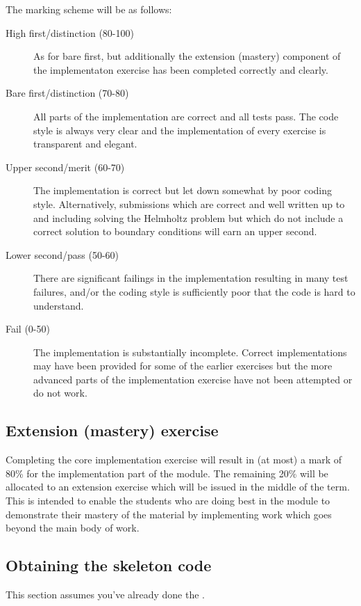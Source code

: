 \documentclass{book}
\begin{document}
The marking scheme will be as follows:
\begin{description}
\item[{High first/distinction (80-100)}] \leavevmode
As for bare first, but additionally the extension (mastery)
component of the implementaton exercise has been completed correctly
and clearly.

\item[{Bare first/distinction (70-80)}] \leavevmode
All parts of the implementation are correct and all tests pass. The
code style is always very clear and the implementation of every
exercise is transparent and elegant.

\item[{Upper second/merit (60-70)}] \leavevmode
The implementation is correct but let down somewhat by poor coding
style. Alternatively, submissions which are correct and well
written up to and including solving the Helmholtz problem but
which do not include a correct solution to boundary conditions will
earn an upper second.

\item[{Lower second/pass (50-60)}] \leavevmode
There are significant failings in the implementation resulting in
many test failures, and/or the coding style is
sufficiently poor that the code is hard to understand.

\item[{Fail (0-50)}] \leavevmode
The implementation is substantially incomplete. Correct
implementations may have been provided for some of the earlier exercises but
the more advanced parts of the implementation exercise have not been
attempted or do not work.

\end{description}


\subsection{Extension (mastery) exercise}
\label{\detokenize{index:extension-mastery-exercise}}
Completing the core implementation exercise will result in (at most) a
mark of 80\% for the implementation part of the module. The remaining
20\% will be allocated to an extension exercise which will be issued in
the middle of the term. This is intended to enable the students who
are doing best in the module to demonstrate their mastery of the
material by implementing work which goes beyond the main body of work.


\subsection{Obtaining the skeleton code}
\label{\detokenize{index:obtaining-the-skeleton-code}}
This section assumes you’ve already done the {\hyperref[\detokenize{tools:bitbucket-git}]{}}.
\end{document}
